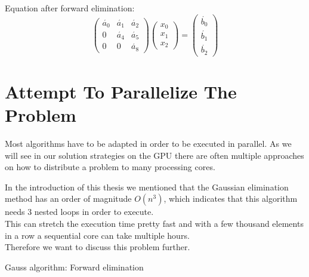 \documentclass[draft, final]{vutinfth} %
\begin{document}
		Equation after forward elimination:
		\begin{equation}
			\begin{pmatrix}
			 \acute{a_{0}} &  \acute{a_{1}} & \acute{a_{2}} \\ 
			 0           &  \acute{a_{4}} & \acute{a_{5}} \\ 
			 0           &  0           & \acute{a_{8}} 
			\end{pmatrix}
			\begin{pmatrix}
			 x_{0}\\ 
			 x_{1}\\ 
			 x_{2}
			\end{pmatrix}
			=
			\begin{pmatrix}
			 \acute{b_{0}}\\ 
			 \acute{b_{1}}\\ 
			 \acute{b_{2}}
			\end{pmatrix}
		\end{equation}

	\section{Attempt To Parallelize The Problem}
	\label{sec:parallelize_prob}
		Most algorithms have to be adapted in order to be executed in parallel. As we will see in our solution strategies on the GPU there are often multiple approaches on how to distribute a problem to many processing cores.

		In the introduction of this thesis we mentioned that the Gaussian elimination method has an order of magnitude $O(n^3)$, which indicates that this algorithm needs 3 nested loops in order to execute.\\
		This can stretch the execution time pretty fast and with a few thousand elements in a row a sequential core can take multiple hours.\\
		Therefore we want to discuss this problem further.

		\begin{algorithm}[!ht]
			\BlankLine


			\caption{Gauss algorithm: Forward elimination}
			\label{alg:forward_elem}
		\end{algorithm}
\end{document}
